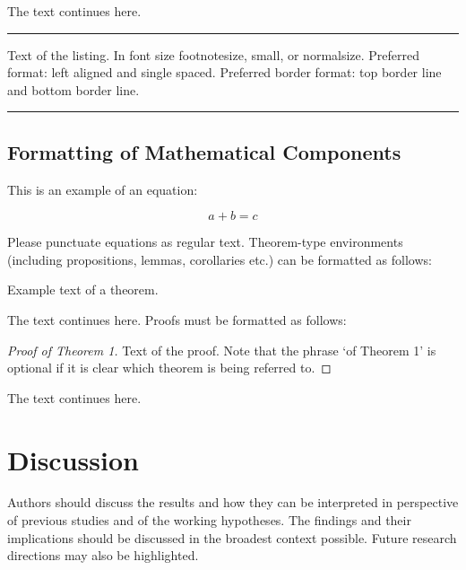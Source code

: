 \documentclass[jdss,article,submit,moreauthors,pdftex]{Definitions/jdss}
\begin{document}
The text continues here.

\begin{listing}[H]
\caption{Title of the listing}
\rule{\textwidth}{1pt}
\raggedright Text of the listing. In font size footnotesize, small, or normalsize. Preferred format: left aligned and single spaced. Preferred border format: top border line and bottom border line.
\rule{\textwidth}{1pt}
\end{listing}


\subsection{Formatting of Mathematical Components}

This is an example of an equation:

\begin{equation}
a + b = c
\end{equation}

Please punctuate equations as regular text. Theorem-type environments (including propositions, lemmas, corollaries etc.) can be formatted as follows:
\begin{Theorem}
Example text of a theorem.
\end{Theorem}

The text continues here. Proofs must be formatted as follows:

\begin{proof}[Proof of Theorem 1]
Text of the proof. Note that the phrase `of Theorem 1' is optional if it is clear which theorem is being referred to.
\end{proof}

The text continues here.

\section{Discussion}

Authors should discuss the results and how they can be interpreted in perspective of previous studies and of the working hypotheses. The findings and their implications should be discussed in the broadest context possible. Future research directions may also be highlighted.
\end{document}
